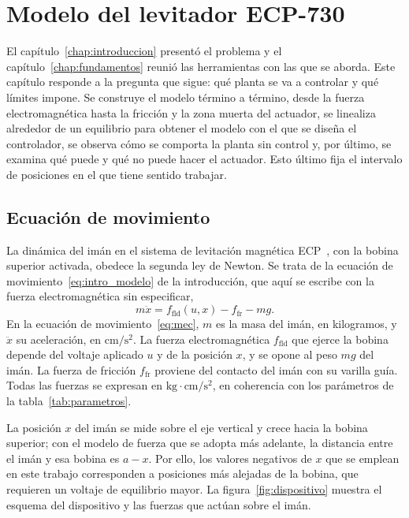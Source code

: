 \chapter{Modelo del levitador ECP-730}\label{chap:modelo}

El capítulo~\ref{chap:introduccion} presentó el problema y el capítulo~\ref{chap:fundamentos} reunió las herramientas con las que se aborda. Este capítulo responde a la pregunta que sigue: qué planta se va a controlar y qué límites impone. Se construye el modelo término a término, desde la fuerza electromagnética hasta la fricción y la zona muerta del actuador, se linealiza alrededor de un equilibrio para obtener el modelo con el que se diseña el controlador, se observa cómo se comporta la planta sin control y, por último, se examina qué puede y qué no puede hacer el actuador. Esto último fija el intervalo de posiciones en el que tiene sentido trabajar.

\section{Ecuación de movimiento}\label{sec:ec_movimiento}

La dinámica del imán en el sistema de levitación magnética ECP~\cite{730}, con la bobina superior activada, obedece la segunda ley de Newton. Se trata de la ecuación de movimiento~\eqref{eq:intro_modelo} de la introducción, que aquí se escribe con la fuerza electromagnética sin especificar,
\begin{equation}
m\ddot{x} = f_{\text{fld}}(u,x) - f_{\text{fr}} - mg .
\label{eq:mec}
\end{equation}
En la ecuación de movimiento~\eqref{eq:mec}, $m$ es la masa del imán, en kilogramos, y $\ddot{x}$ su aceleración, en $\text{cm}/\text{s}^2$. La fuerza electromagnética $f_{\text{fld}}$ que ejerce la bobina depende del voltaje aplicado $u$ y de la posición $x$, y se opone al peso $mg$ del imán. La fuerza de fricción $f_{\text{fr}}$ proviene del contacto del imán con su varilla guía. Todas las fuerzas se expresan en $\text{kg}\cdot\text{cm}/\text{s}^2$, en coherencia con los parámetros de la tabla~\ref{tab:parametros}.

La posición $x$ del imán se mide sobre el eje vertical y crece hacia la bobina superior; con el modelo de fuerza que se adopta más adelante, la distancia entre el imán y esa bobina es $a-x$. Por ello, los valores negativos de $x$ que se emplean en este trabajo corresponden a posiciones más alejadas de la bobina, que requieren un voltaje de equilibrio mayor. La figura~\ref{fig:dispositivo} muestra el esquema del dispositivo y las fuerzas que actúan sobre el imán.

